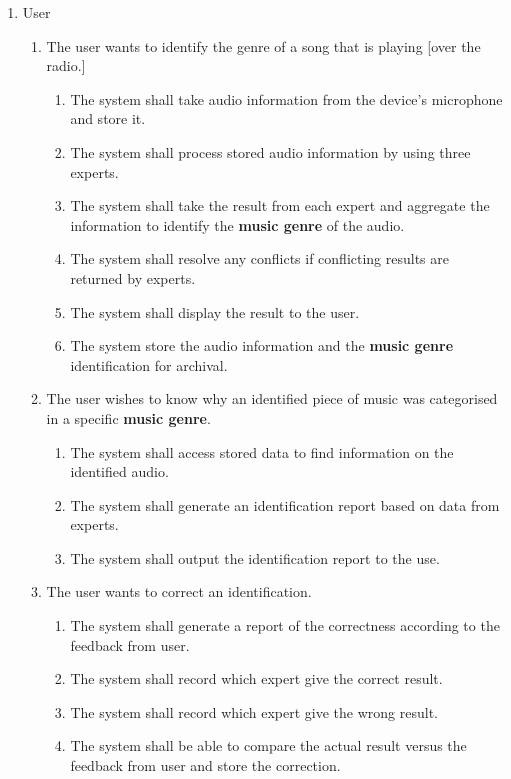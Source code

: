 \documentclass[]{article}
\begin{document}
\begin{enumerate}[{VP}1.]
	\item User 
	\begin{enumerate}[{BE1}.1]
		\item The user wants to identify the genre of a song that is playing [over the radio.]
		\begin{enumerate}
			\item The system shall take audio information from the device’s microphone and store it.
			\item The system shall process stored audio information by using three experts.
			\item The system shall take the result from each expert and aggregate the information to identify the \textbf{music genre} of the audio.

			\item The system shall resolve any conflicts if conflicting results are returned by experts.
			\item The system shall display the result to the user.
			\item The system store the audio information and the \textbf{music genre} identification for archival.
		\end{enumerate}
		\item The user wishes to know why an identified piece of music was categorised in a specific \textbf{music genre}.
		\begin{enumerate}
		\item The system shall access stored data to find information on the identified audio.
		\item The system shall generate an identification report based on data from experts.
		\item The system shall output the identification report to the use.
		\end{enumerate}
	\item The user wants to correct an identification.
		\begin{enumerate}
			\item The system shall generate a report of the correctness according to the feedback from user.
			\item The system shall record which expert give the correct result.
			\item The system shall record which expert give the wrong result.
			\item The system shall be able to compare the actual result versus the feedback from user and store the correction.
		\end{enumerate}
		

\end{enumerate}
\end{enumerate}
\end{document}
